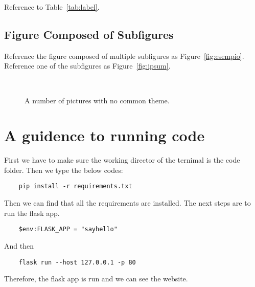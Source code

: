 \documentclass[
12pt, %
a4paper, %
oneside, %
headinclude,footinclude, %
BCOR5mm, %
]{scrartcl}
\begin{document}
Reference to Table~\vref{tab:label}. %


\subsection{Figure Composed of Subfigures}

Reference the figure composed of multiple subfigures as Figure~\vref{fig:esempio}. Reference one of the subfigures as Figure~\vref{fig:ipsum}. %

\lipsum[15-18] %

\begin{figure}[tb]
\centering
{} \quad
{} \\
 \quad
{}
\caption[A number of pictures.]{A number of pictures with no common theme.} %
\label{fig:esempio}
\end{figure}


\renewcommand{\refname}{\spacedlowsmallcaps{References}} %


\clearpage



\clearpage
\appendix
\section{A guidence to running code}
First we have to make sure the working director of the ternimal is the code folder. Then we type the below codes:
\begin{lstlisting}
    pip install -r requirements.txt
\end{lstlisting}
Then we can find that all the requirements are installed. The next steps are to run the flask app. 
\begin{lstlisting}
    $env:FLASK_APP = "sayhello"
\end{lstlisting}
And then
\begin{lstlisting}
    flask run --host 127.0.0.1 -p 80
\end{lstlisting}
Therefore, the flask app is run and we can see the website.
\end{document}
